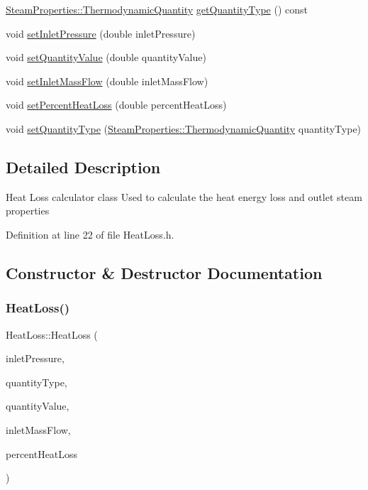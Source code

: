 \begin{DoxyCompactItemize}
\hyperlink{class_steam_properties_ae0294bedf7d178c2d8fb6aed0f62fbff}{Steam\+Properties\+::\+Thermodynamic\+Quantity} \hyperlink{class_heat_loss_a92dc973c0fd81df192207b3df55d6c2b}{get\+Quantity\+Type} () const
\item 
void \hyperlink{class_heat_loss_ab0a6b1f2a964d161d25758318f25f7e3}{set\+Inlet\+Pressure} (double inlet\+Pressure)
\item 
void \hyperlink{class_heat_loss_ae6b6c4ac28471d7bc94e3886c48a90bd}{set\+Quantity\+Value} (double quantity\+Value)
\item 
void \hyperlink{class_heat_loss_ac4154dc9922b6ddf3f2e7a10cc64c61f}{set\+Inlet\+Mass\+Flow} (double inlet\+Mass\+Flow)
\item 
void \hyperlink{class_heat_loss_a2a4a80b16c1f975e194ae466b20d46bd}{set\+Percent\+Heat\+Loss} (double percent\+Heat\+Loss)
\item 
void \hyperlink{class_heat_loss_a7c125f1137f31eba8826a1aa3b905290}{set\+Quantity\+Type} (\hyperlink{class_steam_properties_ae0294bedf7d178c2d8fb6aed0f62fbff}{Steam\+Properties\+::\+Thermodynamic\+Quantity} quantity\+Type)
\end{DoxyCompactItemize}


\subsection{Detailed Description}
Heat Loss calculator class Used to calculate the heat energy loss and outlet steam properties 

Definition at line 22 of file Heat\+Loss.\+h.



\subsection{Constructor \& Destructor Documentation}
\mbox{\label{class_heat_loss_a1c1bba4ef783d97e2ed63f39f625e82f}} 
\subsubsection{\texorpdfstring{Heat\+Loss()}{HeatLoss()}\hspace{0.1cm}{\footnotesize\ttfamily [1/3]}}
{\footnotesize\ttfamily Heat\+Loss\+::\+Heat\+Loss (\begin{DoxyParamCaption}\item[{double}]{inlet\+Pressure,  }\item[{\hyperlink{class_steam_properties_ae0294bedf7d178c2d8fb6aed0f62fbff}{Steam\+Properties\+::\+Thermodynamic\+Quantity}}]{quantity\+Type,  }\item[{double}]{quantity\+Value,  }\item[{double}]{inlet\+Mass\+Flow,  }\item[{double}]{percent\+Heat\+Loss }\end{DoxyParamCaption})}

